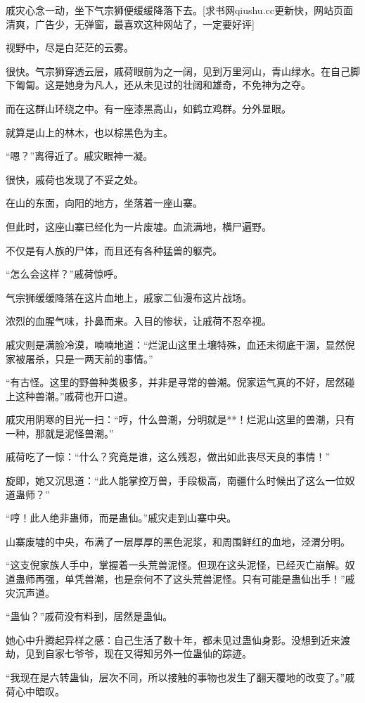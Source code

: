 \begin{this_body}
戚灾心念一动，坐下气宗狮便缓缓降落下去。[求书网qiushu.cc更新快，网站页面清爽，广告少，无弹窗，最喜欢这种网站了，一定要好评]

视野中，尽是白茫茫的云雾。

很快。气宗狮穿透云层，戚荷眼前为之一阔，见到万里河山，青山绿水。在自己脚下匍匐。这是她身为凡人，还从未见过的壮阔和雄奇，不免神为之夺。

而在这群山环绕之中。有一座漆黑高山，如鹤立鸡群。分外显眼。

就算是山上的林木，也以棕黑色为主。

“嗯？”离得近了。戚灾眼神一凝。

很快，戚荷也发现了不妥之处。

在山的东面，向阳的地方，坐落着一座山寨。

但此时，这座山寨已经化为一片废墟。血流满地，横尸遍野。

不仅是有人族的尸体，而且还有各种猛兽的躯壳。

“怎么会这样？”戚荷惊呼。

气宗狮缓缓降落在这片血地上，戚家二仙漫布这片战场。

浓烈的血腥气味，扑鼻而来。入目的惨状，让戚荷不忍卒视。

戚灾则是满脸冷漠，喃喃地道：“烂泥山这里土壤特殊，血还未彻底干涸，显然倪家被屠杀，只是一两天前的事情。”

“有古怪。这里的野兽种类极多，并非是寻常的兽潮。倪家运气真的不好，居然碰上这种兽潮。”戚荷也开口道。

戚灾用阴寒的目光一扫：“哼，什么兽潮，分明就是**！烂泥山这里的兽潮，只有一种，那就是泥怪兽潮。”

戚荷吃了一惊：“什么？究竟是谁，这么残忍，做出如此丧尽天良的事情！”

旋即，她又沉思道：“此人能掌控万兽，手段极高，南疆什么时候出了这么一位奴道蛊师？”

“哼！此人绝非蛊师，而是蛊仙。”戚灾走到山寨中央。

山寨废墟的中央，布满了一层厚厚的黑色泥浆，和周围鲜红的血地，泾渭分明。

“这支倪家族人手中，掌握着一头荒兽泥怪。但现在这头泥怪，已经灭亡崩解。奴道蛊师再强，单凭兽潮，也是奈何不了这头荒兽泥怪。只有可能是蛊仙出手！”戚灾沉声道。

“蛊仙？”戚荷没有料到，居然是蛊仙。

她心中升腾起异样之感：自己生活了数十年，都未见过蛊仙身影。没想到近来渡劫，见到自家七爷爷，现在又得知另外一位蛊仙的踪迹。

“我现在是六转蛊仙，层次不同，所以接触的事物也发生了翻天覆地的改变了。”戚荷心中暗叹。


\end{this_body}

